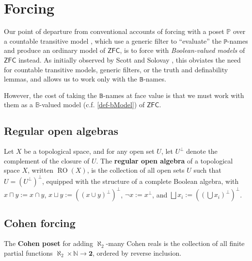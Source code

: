 \documentclass[sigplan,10pt,review, anonymous]{acmart}
\theoremstyle{definition}
\newcommand{\ZFC}{\mathsf{ZFC}}
\begin{document}


\section{Forcing} \label{section:forcing}
Our point of departure from conventional accounts of forcing with a poset \(\mathbb{P}\) over a countable transitive model \cite{kunen2014set, jech2013set}, which use a generic filter to ``evaluate'' the \lstinline{ℙ}-names and produce an ordinary model of \(\ZFC\), is to force with \emph{Boolean-valued models} of \(\ZFC\) instead. As initially observed by Scott and Solovay \cite{scott-solovay}, this obviates the need for countable transitive models, generic filters, or the truth and definability lemmas, and allows us to work only with the \lstinline{𝔹}-names.

However, the cost of taking the \lstinline{𝔹}-names at face value is that we must work with them as a \(\mathbb{B}\)-valued model (c.f. \ref{def-bModel}) of \(\mathsf{ZFC}\).

\subsection{Regular open algebras}
\begin{definition}
  Let $X$ be a topological space, and for any open set $U$, let $U^\perp$ denote the complement of the closure of $U$. The \textbf{regular open algebra} of a topological space $X$, written $\operatorname{RO}(X)$, is the collection of all open sets $U$ such that $U = (U^\perp)^\perp$, equipped with the structure of a complete Boolean algebra, with $x \sqcap y := x \cap y$, $x \sqcup y := ((x \cup y)^\perp)^\perp$, $\neg x := x^\perp$, and $\bigsqcup x_i := ((\bigcup x_i)^\perp)^\perp$.
\end{definition}

\subsection{Cohen forcing}
\begin{definition}
  The \textbf{Cohen poset} for adding $\aleph_2$-many Cohen reals is the collection of all finite partial functions $\aleph_2 \times \mathbb{N} \to \mathbf{2}$, ordered by reverse inclusion.
\end{definition}
\end{document}
